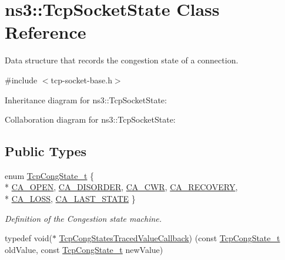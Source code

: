 \hypertarget{classns3_1_1TcpSocketState}{}\section{ns3\+:\+:Tcp\+Socket\+State Class Reference}
\label{classns3_1_1TcpSocketState}


Data structure that records the congestion state of a connection.  




{\ttfamily \#include $<$tcp-\/socket-\/base.\+h$>$}



Inheritance diagram for ns3\+:\+:Tcp\+Socket\+State\+:


Collaboration diagram for ns3\+:\+:Tcp\+Socket\+State\+:
\subsection*{Public Types}
\begin{DoxyCompactItemize}
\item 
enum \hyperlink{classns3_1_1TcpSocketState_a6fc313945a33d48fd60cbffe0c787b19}{Tcp\+Cong\+State\+\_\+t} \{ \\*
\hyperlink{classns3_1_1TcpSocketState_a6fc313945a33d48fd60cbffe0c787b19af2d22f02a77b603394c34d4968bad142}{C\+A\+\_\+\+O\+P\+EN}, 
\hyperlink{classns3_1_1TcpSocketState_a6fc313945a33d48fd60cbffe0c787b19a389f9d267c6b0a752d39a0d1a9ee3aae}{C\+A\+\_\+\+D\+I\+S\+O\+R\+D\+ER}, 
\hyperlink{classns3_1_1TcpSocketState_a6fc313945a33d48fd60cbffe0c787b19a67d118544a382f82f0429906b5f5f94f}{C\+A\+\_\+\+C\+WR}, 
\hyperlink{classns3_1_1TcpSocketState_a6fc313945a33d48fd60cbffe0c787b19a092ee3d215c587170a751974dac5f663}{C\+A\+\_\+\+R\+E\+C\+O\+V\+E\+RY}, 
\\*
\hyperlink{classns3_1_1TcpSocketState_a6fc313945a33d48fd60cbffe0c787b19ad50c191d2648f5472641d8e144ccbf3d}{C\+A\+\_\+\+L\+O\+SS}, 
\hyperlink{classns3_1_1TcpSocketState_a6fc313945a33d48fd60cbffe0c787b19a57dd96a466459795fb936f3df57ae52f}{C\+A\+\_\+\+L\+A\+S\+T\+\_\+\+S\+T\+A\+TE}
 \}\begin{DoxyCompactList}\small\item\em Definition of the Congestion state machine. \end{DoxyCompactList}
\item 
typedef void($\ast$ \hyperlink{group__tcp_ga17cd2398cfb9b9c1f991adf6d7f21e19}{Tcp\+Cong\+States\+Traced\+Value\+Callback}) (const \hyperlink{classns3_1_1TcpSocketState_a6fc313945a33d48fd60cbffe0c787b19}{Tcp\+Cong\+State\+\_\+t} old\+Value, const \hyperlink{classns3_1_1TcpSocketState_a6fc313945a33d48fd60cbffe0c787b19}{Tcp\+Cong\+State\+\_\+t} new\+Value)
\end{DoxyCompactItemize}
